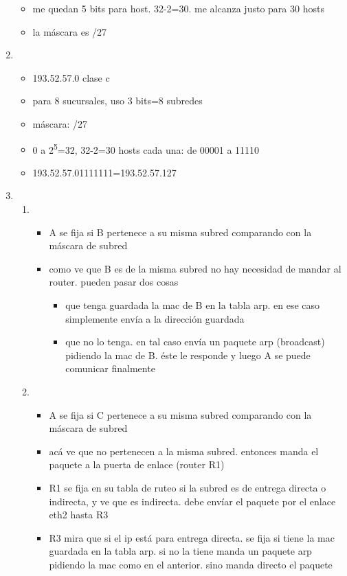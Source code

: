\documentclass[11pt]{article}
\begin{document}
\begin{enumerate}
\begin{itemize}
\item me quedan 5 bits para host. 32-2=30. me alcanza justo para 30 hosts
\item la máscara es /27
\end{itemize}
\item \begin{itemize}
\item 193.52.57.0 clase c
\item para 8 sucursales, uso 3 bits=8 subredes
\item máscara: /27
\item 0 a 2\textsuperscript{5}=32, 32-2=30 hosts cada una: de 00001 a 11110
\item 193.52.57.01111111=193.52.57.127
\end{itemize}
\item \begin{enumerate}
\item \begin{itemize}
\item A se fija si B pertenece a su misma subred comparando con la máscara de subred
\item como ve que B es de la misma subred no hay necesidad de mandar al router. pueden pasar dos cosas
\begin{itemize}
\item que tenga guardada la mac de B en la tabla arp. en ese caso simplemente envía a la dirección guardada
\item que no lo tenga. en tal caso envía un paquete arp (broadcast) pidiendo la mac de B. éste le responde y luego A se puede comunicar finalmente
\end{itemize}
\end{itemize}
\item \begin{itemize}
\item A se fija si C pertenece a su misma subred comparando con la máscara de subred
\item acá ve que no pertenecen a la misma subred. entonces manda el paquete a la puerta de enlace (router R1)
\item R1 se fija en su tabla de ruteo si la subred es de entrega directa o indirecta, y ve que es indirecta. debe envíar el paquete por el enlace eth2 hasta R3
\item R3 mira que si el ip está para entrega directa. se fija si tiene la mac guardada en la tabla arp. si no la tiene manda un paquete arp pidiendo la mac como en el anterior. sino manda directo el paquete
\end{itemize}

\end{enumerate}
\end{enumerate}
\end{document}
